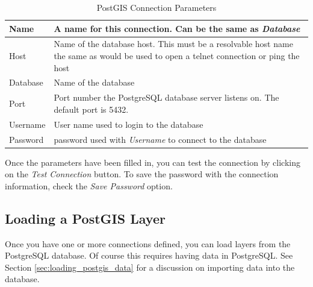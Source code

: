 \begin{table}[h]
\centering
\caption{PostGIS Connection Parameters}\label{tab:postgis_connection_parms}\medskip
 \begin{tabular}{|l|p{5in}|}
\hline Name & A name for this connection. Can be the same as \textsl{Database}
\\
\hline Host \index{PostgreSQL!host}
& Name of the database host. This must be a resolvable host name the same as would be used to open a telnet connection or ping the host \\
\hline Database \index{PostgreSQL!database} & Name of the database  \\
\hline Port \index{PostgreSQL!port}& Port number the PostgreSQL database server listens on. The default port is 5432.\\
\hline Username \index{PostgreSQL!username}& User name used to login to the database \\
\hline Password \index{PostgreSQL!password}& password used with \textsl{Username} to connect to the database\\
\hline
\end{tabular}
\end{table}
Once the parameters have been filled in, you can test the connection by clicking
on the \textsl{Test Connection} button. To save the password with the connection information, check the \textsl{Save Password} option.
\begin{Tip}\caption{\textsc{QGIS User Settings and
Security}}
\end{Tip}
\subsection{Loading a PostGIS Layer}
Once you have one or more connections defined, you can load layers from the PostgreSQL database. Of course this requires having data in PostgreSQL. See Section \ref{sec:loading_postgis_data} for a discussion on importing data into the database. 

